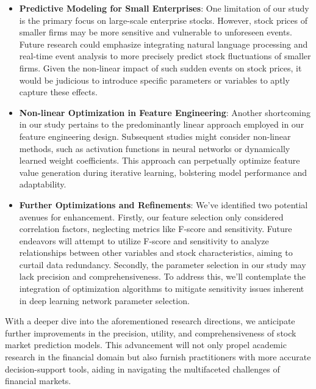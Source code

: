 \documentclass[sn-mathphys,Numbered]{sn-jnl}
\theoremstyle{thmstyleone}%
\theoremstyle{thmstyletwo}%
\theoremstyle{thmstylethree}%
\begin{document}
\begin{itemize}
    \item \textbf{Predictive Modeling for Small Enterprises}: One limitation of our study is the primary focus on large-scale enterprise stocks. However, stock prices of smaller firms may be more sensitive and vulnerable to unforeseen events. Future research could emphasize integrating natural language processing and real-time event analysis to more precisely predict stock fluctuations of smaller firms. Given the non-linear impact of such sudden events on stock prices, it would be judicious to introduce specific parameters or variables to aptly capture these effects.
    
    \item \textbf{Non-linear Optimization in Feature Engineering}: Another shortcoming in our study pertains to the predominantly linear approach employed in our feature engineering design. Subsequent studies might consider non-linear methods, such as activation functions in neural networks or dynamically learned weight coefficients. This approach can perpetually optimize feature value generation during iterative learning, bolstering model performance and adaptability.
    
    \item \textbf{Further Optimizations and Refinements}: We've identified two potential avenues for enhancement. Firstly, our feature selection only considered correlation factors, neglecting metrics like F-score and sensitivity. Future endeavors will attempt to utilize F-score and sensitivity to analyze relationships between other variables and stock characteristics, aiming to curtail data redundancy. Secondly, the parameter selection in our study may lack precision and comprehensiveness. To address this, we'll contemplate the integration of optimization algorithms to mitigate sensitivity issues inherent in deep learning network parameter selection.
\end{itemize}

With a deeper dive into the aforementioned research directions, we anticipate further improvements in the precision, utility, and comprehensiveness of stock market prediction models. This advancement will not only propel academic research in the financial domain but also furnish practitioners with more accurate decision-support tools, aiding in navigating the multifaceted challenges of financial markets.
\end{document}
